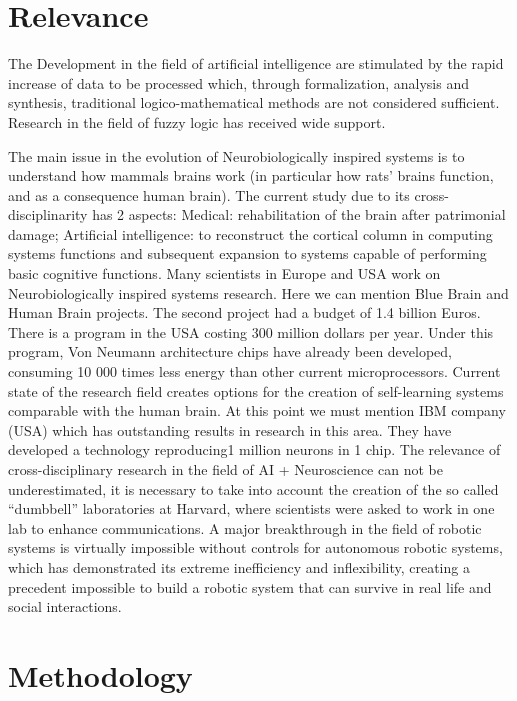 \section{Relevance}\label{relevance}

The Development in the field of artificial intelligence are stimulated
by the rapid increase of data to be processed which, through
formalization, analysis and synthesis, traditional logico-mathematical
methods are not considered sufficient. Research in the field of fuzzy
logic has received wide support.

The main issue in the evolution of Neurobiologically inspired systems is
to understand how mammals brains work (in particular how rats' brains
function, and as a consequence human brain). The current study due to
its cross-disciplinarity has 2 aspects: Medical: rehabilitation of the
brain after patrimonial damage; Artificial intelligence: to reconstruct
the cortical column in computing systems functions and subsequent
expansion to systems capable of performing basic cognitive functions.
Many scientists in Europe and USA work on Neurobiologically inspired
systems research. Here we can mention Blue Brain and Human Brain
projects. The second project had a budget of 1.4 billion Euros. There is
a program in the USA costing 300 million dollars per year. Under this
program, Von Neumann architecture chips have already been developed,
consuming 10 000 times less energy than other current microprocessors.
Current state of the research field creates options for the creation of
self-learning systems comparable with the human brain. At this point we
must mention IBM company (USA) which has outstanding results in research
in this area. They have developed a technology reproducing1 million
neurons in 1 chip. The relevance of cross-disciplinary research in the
field of AI + Neuroscience can not be underestimated, it is necessary to
take into account the creation of the so called ``dumbbell''
laboratories at Harvard, where scientists were asked to work in one lab
to enhance communications. A major breakthrough in the field of robotic
systems is virtually impossible without controls for autonomous robotic
systems, which has demonstrated its extreme inefficiency and
inflexibility, creating a precedent impossible to build a robotic system
that can survive in real life and social interactions.

\section{Methodology}\label{methodology}

